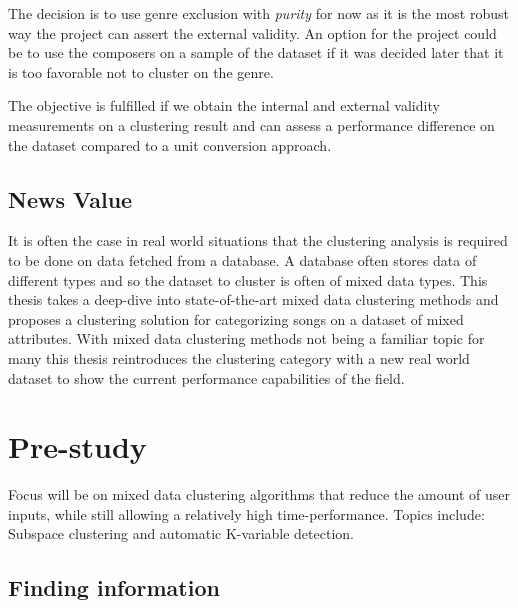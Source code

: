 \documentclass[a4paper,11pt]{article}
\begin{document}
The decision is to use genre exclusion with \textit{purity} for now as it is the most robust way the project can assert the external validity. An option for the project could be to use the composers on a sample of the dataset if it was decided later that it is too favorable not to cluster on the genre.

The objective is fulfilled if we obtain the internal and external validity measurements on a clustering result and can assess a performance difference on the dataset compared to a unit conversion approach.


\subsection{News Value}

It is often the case in real world situations that the clustering
analysis is required to be done on data fetched from a database. A
database often stores data of different types and so the dataset to
cluster is often of mixed data types. This thesis takes a deep-dive into state-of-the-art mixed data clustering methods and proposes a clustering solution for categorizing songs on a dataset of mixed attributes. With mixed data clustering methods not being a familiar topic for many this thesis reintroduces the clustering category with a new real world dataset to show the current performance capabilities of the field.

\section{Pre-study}


Focus will be on mixed data clustering algorithms that reduce the amount of user inputs, while still allowing a relatively high time-performance. Topics include: Subspace clustering and automatic K-variable detection.

\subsection{Finding information}
\end{document}
